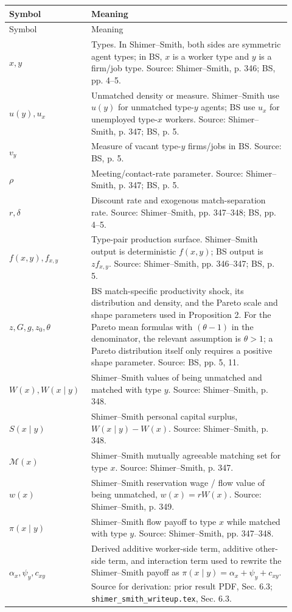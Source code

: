 ﻿\documentclass[11pt]{article}
\newcommand{\1}{\mathbf{1}}
\begin{document}
\begin{longtable}{>{\raggedright\arraybackslash}p{0.24\linewidth}
                >{\raggedright\arraybackslash}p{0.68\linewidth}}
\toprule
Symbol & Meaning \\
\midrule
\endfirsthead
\toprule
Symbol & Meaning \\
\midrule
\endhead
$x,y$ & Types. In Shimer--Smith, both sides are symmetric agent types; in BS, $x$ is a worker type and $y$ is a firm/job type. Source: Shimer--Smith, p. 346; BS, pp. 4--5. \\
$u(y),u_x$ & Unmatched density or measure. Shimer--Smith use $u(y)$ for unmatched type-$y$ agents; BS use $u_x$ for unemployed type-$x$ workers. Source: Shimer--Smith, p. 347; BS, p. 5. \\
$v_y$ & Measure of vacant type-$y$ firms/jobs in BS. Source: BS, p. 5. \\
$\rho$ & Meeting/contact-rate parameter. Source: Shimer--Smith, p. 347; BS, p. 5. \\
$r,\delta$ & Discount rate and exogenous match-separation rate. Source: Shimer--Smith, pp. 347--348; BS, pp. 4--5. \\
$f(x,y),f_{x,y}$ & Type-pair production surface. Shimer--Smith output is deterministic $f(x,y)$; BS output is $zf_{x,y}$. Source: Shimer--Smith, pp. 346--347; BS, p. 5. \\
$z,G,g,z_0,\theta$ & BS match-specific productivity shock, its distribution and density, and the Pareto scale and shape parameters used in Proposition 2. For the Pareto mean formulas with $(\theta-1)$ in the denominator, the relevant assumption is $\theta>1$; a Pareto distribution itself only requires a positive shape parameter. Source: BS, pp. 5, 11. \\
$W(x),W(x\mid y)$ & Shimer--Smith values of being unmatched and matched with type $y$. Source: Shimer--Smith, p. 348. \\
$S(x\mid y)$ & Shimer--Smith personal capital surplus, $W(x\mid y)-W(x)$. Source: Shimer--Smith, p. 348. \\
$\mathcal M(x)$ & Shimer--Smith mutually agreeable matching set for type $x$. Source: Shimer--Smith, p. 347. \\
$w(x)$ & Shimer--Smith reservation wage / flow value of being unmatched, $w(x)=rW(x)$. Source: Shimer--Smith, p. 349. \\
$\pi(x\mid y)$ & Shimer--Smith flow payoff to type $x$ while matched with type $y$. Source: Shimer--Smith, pp. 347--348. \\
$\alpha_x,\psi_y,c_{xy}$ & Derived additive worker-side term, additive other-side term, and interaction term used to rewrite the Shimer--Smith payoff as $\pi(x\mid y)=\alpha_x+\psi_y+c_{xy}$. Source for derivation: prior result PDF, Sec. 6.3; \texttt{shimer\_smith\_writeup.tex}, Sec. 6.3. \\

\end{longtable}
\end{document}
